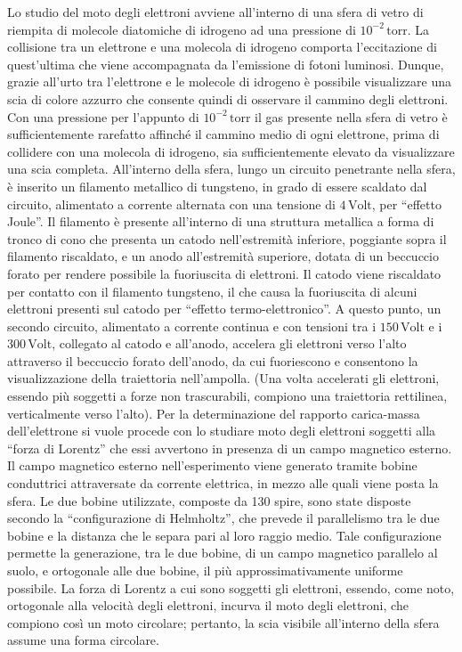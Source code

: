 \documentclass[a4paper,12pt]{article}
\begin{document}
Lo studio del moto degli elettroni avviene all’interno di una sfera di vetro di riempita di molecole diatomiche di idrogeno ad una pressione di \(10^{-2} \, \text{torr}\). La collisione tra un elettrone e una molecola di idrogeno comporta l’eccitazione di quest’ultima che viene accompagnata da l’emissione di fotoni luminosi. Dunque, grazie all’urto tra l’elettrone e le molecole di idrogeno è possibile visualizzare una scia di colore azzurro che consente quindi di osservare il cammino degli elettroni. Con una pressione per l’appunto di \(10^{-2} \, \text{torr}\) il gas presente nella sfera di vetro è sufficientemente rarefatto affinché il cammino medio di ogni elettrone, prima di collidere con una molecola di idrogeno, sia sufficientemente elevato da visualizzare una scia completa. All’interno della sfera, lungo un circuito penetrante nella sfera, è inserito un filamento metallico di tungsteno, in grado di essere scaldato dal circuito, alimentato a corrente alternata con una tensione di \(4 \, \text{Volt}\), per “effetto Joule”. Il filamento è presente all’interno di una struttura metallica a forma di tronco di cono che presenta un catodo nell’estremità inferiore, poggiante sopra il filamento riscaldato, e un anodo all’estremità superiore, dotata di un beccuccio forato per rendere possibile la fuoriuscita di elettroni. Il catodo viene riscaldato per contatto con il filamento tungsteno, il che causa la fuoriuscita di alcuni elettroni presenti sul catodo per “effetto termo-elettronico”. A questo punto, un secondo circuito, alimentato a corrente continua e con tensioni tra i \(150 \, \text{Volt}\) e i \(300 \, \text{Volt}\), collegato al catodo e all’anodo, accelera gli elettroni verso l’alto attraverso il beccuccio forato dell’anodo, da cui fuoriescono e consentono la visualizzazione della traiettoria nell’ampolla. (Una volta accelerati gli elettroni, essendo più soggetti a forze non trascurabili, compiono una traiettoria rettilinea, verticalmente verso l’alto). Per la determinazione del rapporto carica-massa dell’elettrone si vuole procede con lo studiare moto degli elettroni soggetti alla “forza di Lorentz” che essi avvertono in presenza di un campo magnetico esterno. Il campo magnetico esterno nell’esperimento viene generato tramite bobine conduttrici attraversate da corrente elettrica, in mezzo alle quali viene posta la sfera. Le due bobine utilizzate, composte da 130 spire, sono state disposte secondo la “configurazione di Helmholtz”, che prevede il parallelismo tra le due bobine e la distanza che le separa pari al loro raggio medio. Tale configurazione permette la generazione, tra le due bobine, di un campo magnetico parallelo al suolo, e ortogonale alle due bobine, il più approssimativamente uniforme possibile. La forza di Lorentz a cui sono soggetti gli elettroni, essendo, come noto, ortogonale alla velocità degli elettroni, incurva il moto degli elettroni, che compiono così un moto circolare; pertanto, la scia visibile all’interno della sfera assume una forma circolare. 
\end{document}
